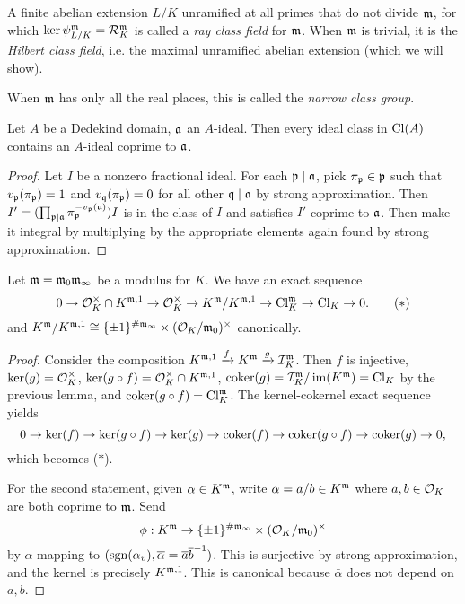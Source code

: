 \documentclass[11pt]{amsart}
\begin{document}
\begin{defn}
    A finite abelian extension $L/K$ unramified at all primes that do not divide $\mathfrak{m}$, for which $\ker \psi_{L/K}^{\mathfrak{m}} = \mathcal{R}_K^{\mathfrak{m}}$ is called a \emph{ray class field} for $\mathfrak{m}$. When $\mathfrak{m}$ is trivial, it is the \emph{Hilbert class field}, i.e. the maximal unramified abelian extension (which we will show). 
\end{defn}


When $\mathfrak{m}$ has only all the real places, this is called the \emph{narrow class group}.


\begin{lem}
    Let $A$ be a Dedekind domain, $\mathfrak{a}$ an $A$-ideal. Then every ideal class in $\operatorname{Cl}(A)$ contains an $A$-ideal coprime to $\mathfrak{a}$.
\end{lem}

\begin{proof}
    Let $I$ be a nonzero fractional ideal. For each $\mathfrak{p}\mid \mathfrak{a}$, pick $\pi_{\mathfrak{p}}\in \mathfrak{p}$ such that $v_{\mathfrak{p}}(\pi_{\mathfrak{p}}) = 1$ and $v_{\mathfrak{q}}(\pi_{\mathfrak{p}}) = 0$ for all other $\mathfrak{q}\mid \mathfrak{a}$ by strong approximation. Then $I' = (\prod_{\mathfrak{p}\mid \mathfrak{a}} \pi_{\mathfrak{p}}^{-v_{\mathfrak{p}}(\mathfrak{a})})I$ is in the class of $I$ and satisfies $I'$ coprime to $\mathfrak{a}$. Then make it integral by multiplying by the appropriate elements again found by strong approximation.
\end{proof}


\begin{prop}
    Let $\mathfrak{m} = \mathfrak{m}_0\mathfrak{m}_\infty$ be a modulus for $K$. We have an exact sequence
    \[0\to \mathcal{O}_K^\times \cap K^{\mathfrak{m}, 1} \to \mathcal{O}_K^\times \to K^{\mathfrak{m}}/K^{\mathfrak{m},1} \to \operatorname{Cl}_K^{\mathfrak{m}} \to \operatorname{Cl}_K \to 0. \tag{$\ast$}\]
    and $K^{\mathfrak{m}}/K^{\mathfrak{m},1} \cong \{\pm 1\}^{\#\mathfrak{m}_{\infty}} \times(\mathcal{O}_K/\mathfrak{m}_0)^\times$ canonically. \
\end{prop}

\begin{proof}
    Consider the composition $K^{\mathfrak{m},1}\xrightarrow{f}K^{\mathfrak{m}} \xrightarrow{g} \mathcal{I}_K^{\mathfrak{m}}$. Then $f$ is injective, $\ker(g) = \mathcal{O}_K^\times$, $\ker(g\circ f) = \mathcal{O}_K^\times\cap K^{\mathfrak{m},1}$, $\operatorname{coker}(g) = \mathcal{I}_K^{\mathfrak{m}}/\operatorname{im}(K^{\mathfrak{m}}) = \operatorname{Cl}_K$ by the previous lemma, and $\operatorname{coker}(g\circ f) = \operatorname{Cl}_K^{\mathfrak{m}}$. The kernel-cokernel exact sequence yields
    \[0\to \ker(f) \to \ker(g\circ f) \to \ker(g) \to \operatorname{coker}(f) \to \operatorname{coker}(g\circ f) \to \operatorname{coker}(g) \to 0,\]
    which becomes ($\ast$).

    For the second statement, given $\alpha\in K^{\mathfrak{m}}$, write $\alpha = a/b\in K^{\mathfrak{m}}$ where $a,b\in \mathcal{O}_K$ are both coprime to $\mathfrak{m}$. Send
    \[\phi:K^{\mathfrak{m}} \to \{\pm 1\}^{\#\mathfrak{m}_{\infty}} \times(\mathcal{O}_K/\mathfrak{m}_0)^\times\]
    by $\alpha$ mapping to $(\operatorname{sgn}(\alpha_v), \overline{\alpha} = \overline{a}\overline{b}^{-1})$. This is surjective by strong approximation, and the kernel is precisely $K^{\mathfrak{m},1}$. This is canonical because $\bar{\alpha}$ does not depend on $a,b$.
\end{proof}
\end{document}
